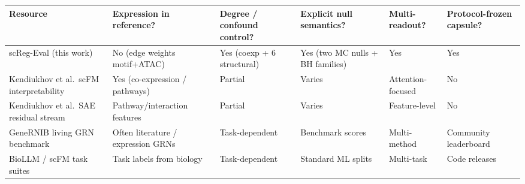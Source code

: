 {\small
\begin{tabularx}{\linewidth}{@{}>{\raggedright\arraybackslash}p{2.15cm}>{\centering\arraybackslash}X>{\centering\arraybackslash}X>{\centering\arraybackslash}X>{\centering\arraybackslash}X>{\centering\arraybackslash}X@{}}
\toprule
Resource & Expression in reference? & Degree / confound control? & Explicit null semantics? & Multi-readout? & Protocol-frozen capsule? \\
\midrule
scReg-Eval (this work) & No (edge weights motif+ATAC) & Yes (coexp + 6 structural) & Yes (two MC nulls + BH families) & Yes & Yes \\
Kendiukhov et al.\ scFM interpretability & Yes (co-expression / pathways) & Partial & Varies & Attention-focused & No \\
Kendiukhov et al.\ SAE residual stream & Pathway/interaction features & Partial & Varies & Feature-level & No \\
GeneRNIB living GRN benchmark & Often literature / expression GRNs & Task-dependent & Benchmark scores & Multi-method & Community leaderboard \\
BioLLM / scFM task suites & Task labels from biology & Task-dependent & Standard ML splits & Multi-task & Code releases \\
\bottomrule
\end{tabularx}
}
